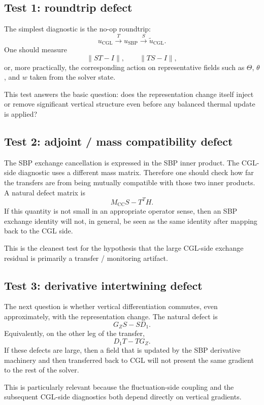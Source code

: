 \documentclass[11pt]{article}
\begin{document}
\subsection{Test 1: roundtrip defect}

The simplest diagnostic is the no-op roundtrip:
\[
u_{\mathrm{CGL}}
\xrightarrow{\,T\,}
u_{\mathrm{SBP}}
\xrightarrow{\,S\,}
\widetilde u_{\mathrm{CGL}}.
\]
One should measure
\[
\|ST - I\|,
\qquad
\|TS - I\|,
\]
or, more practically, the corresponding action on representative fields such as
$\Theta$, $\theta$, and $w$ taken from the solver state.

This test answers the basic question: does the representation change itself
inject or remove significant vertical structure even before any balanced
thermal update is applied?

\subsection{Test 2: adjoint / mass compatibility defect}

The SBP exchange cancellation is expressed in the SBP inner product. The
CGL-side diagnostic uses a different mass matrix. Therefore one should check
how far the transfers are from being mutually compatible with those two inner
products. A natural defect matrix is
\[
M_{\mathrm{CC}}S - T^T H.
\]
If this quantity is not small in an appropriate operator sense, then an SBP
exchange identity will not, in general, be seen as the same identity after
mapping back to the CGL side.

This is the cleanest test for the hypothesis that the large CGL-side exchange
residual is primarily a transfer / monitoring artifact.

\subsection{Test 3: derivative intertwining defect}

The next question is whether vertical differentiation commutes, even
approximately, with the representation change. The natural defect is
\[
G_Z S - S D_1.
\]
Equivalently, on the other leg of the transfer,
\[
D_1 T - T G_Z.
\]
If these defects are large, then a field that is updated by the SBP derivative
machinery and then transferred back to CGL will not present the same gradient
to the rest of the solver.

This is particularly relevant because the fluctuation-side coupling and the
subsequent CGL-side diagnostics both depend directly on vertical gradients.
\end{document}
